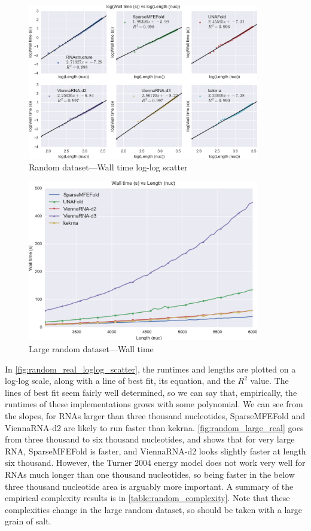 \documentclass{cshonours}
\begin{document}
\begin{figure}[p]
\centering
\includegraphics[width=0.9\textwidth]{res/random_real_loglog_scatter.png}
\caption{Random dataset---Wall time log-log scatter}
\label{fig:random_real_loglog_scatter}
\end{figure}

\begin{figure}[p]
\centering
\includegraphics[width=0.9\textwidth]{res/random_large_real.png}
\caption{Large random dataset---Wall time}
\label{fig:random_large_real}
\end{figure}

In \autoref{fig:random_real_loglog_scatter}, the runtimes and lengths are plotted on a log-log scale, along with a line of best fit, its equation, and the $R^2$ value. The lines of best fit seem fairly well determined, so we can say that, empirically, the runtimes of these implementations grows with some polynomial. We can see from the slopes, for RNAs larger than three thousand nucleotides, SparseMFEFold and ViennaRNA-d2 are likely to run faster than kekrna.  \autoref{fig:random_large_real} goes from three thousand to six thousand nucleotides, and shows that for very large RNA, SparseMFEFold is faster, and ViennaRNA-d2 looks slightly faster at length six thousand. However, the Turner 2004 energy model does not work very well for RNAs much longer than one thousand nucleotides, so being faster in the below three thousand nucleotide area is arguably more important.  A summary of the empirical complexity results is in \autoref{table:random_complexity}. Note that these complexities change in the large random dataset, so should be taken with a large grain of salt.
\end{document}
